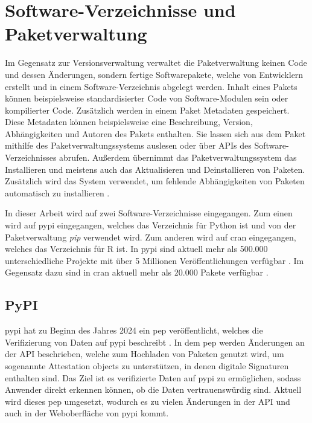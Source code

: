 \section{Software-Verzeichnisse und Paketverwaltung}
\label{sec:paketverwaltung}
Im Gegensatz zur Versionsverwaltung verwaltet die Paketverwaltung keinen Code und dessen Änderungen, sondern fertige Softwarepakete, welche von Entwicklern erstellt und in einem Software-Verzeichnis abgelegt werden.
Inhalt eines Pakets können beispielsweise standardisierter Code von Software-Modulen sein oder kompilierter Code.
Zusätzlich werden in einem Paket Metadaten gespeichert.
Diese Metadaten können beispielsweise eine Beschreibung, Version, Abhängigkeiten und Autoren des Pakets enthalten.
Sie lassen sich aus dem Paket mithilfe des Paketverwaltungssystems auslesen oder über APIs des Software-Verzeichnisses abrufen.
Außerdem übernimmt das Paketverwaltungssystem das Installieren und meistens auch das Aktualisieren und Deinstallieren von Paketen.
Zusätzlich wird das System verwendet, um fehlende Abhängigkeiten von Paketen automatisch zu installieren \autocite{spinellis_package_2012}.

In dieser Arbeit wird auf zwei Software-Verzeichnisse eingegangen.
Zum einen wird auf \gls{pypi} eingegangen, welches das Verzeichnis für Python ist und von der Paketverwaltung \emph{pip} verwendet wird.
Zum anderen wird auf \gls{cran} eingegangen, welches das Verzeichnis für R ist.
In \gls{pypi} sind aktuell mehr als 500.000 unterschiedliche Projekte mit über 5 Millionen Veröffentlichungen verfügbar \autocite{python_software_foundation_pypi_2024}.
Im Gegensatz dazu sind in \gls{cran} aktuell mehr als 20.000 Pakete verfügbar \autocite{cran_team_comprehensive_2024}.

\subsection{PyPI}
\label{subsec:paketverwaltung_pypi}
\gls{pypi} hat zu Beginn des Jahres 2024 ein \gls{pep} veröffentlicht, welches die Verifizierung von Daten auf \gls{pypi} beschreibt \autocite{python_software_foundation_pep_2024}.
In dem \gls{pep} werden Änderungen an der API beschrieben, welche zum Hochladen von Paketen genutzt wird, um sogenannte \glqq Attestation objects\grqq{} zu unterstützen, in denen digitale Signaturen enthalten sind.
Das Ziel ist es verifizierte Daten auf \gls{pypi} zu ermöglichen, sodass Anwender direkt erkennen können, ob die Daten vertrauenswürdig sind.
Aktuell wird dieses \gls{pep} umgesetzt, wodurch es zu vielen Änderungen in der API und auch in der Weboberfläche von \gls{pypi} kommt.

